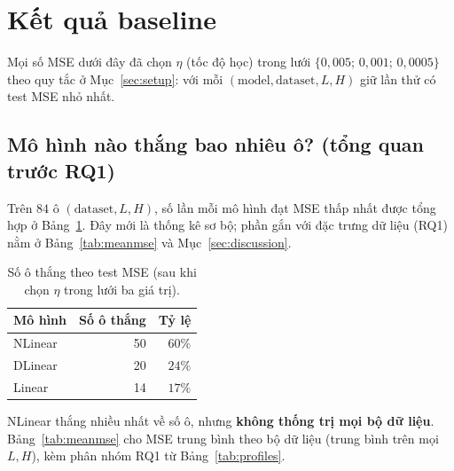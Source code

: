 \section{Kết quả baseline}
\label{sec:results}

Mọi số MSE dưới đây đã chọn \(\eta\) (tốc độ học) trong lưới
\(\{0{,}005;\,0{,}001;\,0{,}0005\}\) theo quy tắc ở Mục~\ref{sec:setup}:
với mỗi \((\mathrm{model},\mathrm{dataset},L,H)\) giữ lần thử có test MSE nhỏ nhất.

\subsection{Mô hình nào thắng bao nhiêu ô? (tổng quan trước RQ1)}

Trên \(84\) ô \((\mathrm{dataset},L,H)\), số lần mỗi mô hình đạt MSE thấp nhất
được tổng hợp ở Bảng~\ref{tab:wins}. Đây mới là thống kê sơ bộ;
phần gắn với đặc trưng dữ liệu (RQ1) nằm ở Bảng~\ref{tab:meanmse}
và Mục~\ref{sec:discussion}.

\begin{table}[H]
  \centering
  \caption{Số ô thắng theo test MSE (sau khi chọn \(\eta\) trong lưới ba giá trị).}
  \label{tab:wins}
  \begin{tabular}{@{}lrr@{}}
    \toprule
    Mô hình & Số ô thắng & Tỷ lệ    \\
    \midrule
    NLinear & 50         & \(60\%\) \\
    DLinear & 20         & \(24\%\) \\
    Linear  & 14         & \(17\%\) \\
    \bottomrule
  \end{tabular}
\end{table}

NLinear thắng nhiều nhất về số ô, nhưng \textbf{không thống trị mọi bộ dữ liệu}.
Bảng~\ref{tab:meanmse} cho MSE trung bình theo bộ dữ liệu (trung bình trên mọi \(L,H\)),
kèm phân nhóm RQ1 từ Bảng~\ref{tab:profiles}.


